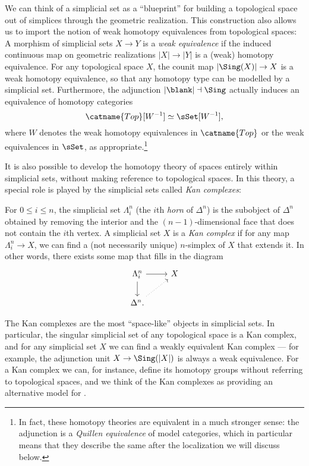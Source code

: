 \documentclass[a4paper,12pt]{article}
\renewcommand{\Top}{\catname{Top}}
\begin{document}
We can think of a simplicial set as a ``blueprint'' for building a
topological space out of simplices through the geometric
realization. This construction also allows us to import the notion of
weak homotopy equivalences from topological spaces: A morphism of
simplicial sets $X \to Y$ is a \emph{weak equivalence} if the induced
continuous map on geometric realizations $|X| \to |Y|$ is a (weak)
homotopy equivalence. For any topological space $X$, the counit map
$|\Sing(X)| \to X$ is a weak homotopy equivalence, so that any
homotopy type can be modelled by a simplicial set. Furthermore, the
adjunction $|\blank| \dashv \Sing$ actually induces an equivalence of homotopy
categories
\[ \Top[W^{-1}] \simeq \sSet[W^{-1}],\] where $W$ denotes the weak
homotopy equivalences in $\Top$ or the weak equivalences in $\sSet$,
as appropriate.\footnote{In fact, these homotopy theories are equivalent
  in a much stronger sense: the adjunction is a \emph{Quillen
    equivalence} of model categories, which in particular means that
  they describe the same \icat{} after the \icatl{} localization we
  will discuss below.}

It is also possible to develop the homotopy theory of spaces entirely
within simplicial sets, without making reference to topological
spaces. In this theory, a special role is played by the simplicial
sets called \emph{Kan complexes}:
\begin{defn}
  For $0 \leq i \leq n$, the simplicial set $\Lambda^{n}_{i}$ (the
  $i$th \emph{horn} of $\Delta^{n}$) is the subobject of $\Delta^{n}$
  obtained by removing the interior and the $(n-1)$-dimensional face
  that does not contain the $i$th vertex. A simplicial set $X$ is a
  \emph{Kan complex} if for any map $\Lambda^{n}_{i} \to X$, we can
  find a (not necessarily unique) $n$-simplex of $X$ that extends
  it. In other words, there exists some map that fills in the diagram
  \[
    \begin{tikzcd}
      \Lambda^{n}_{i} \arrow{r} \arrow{d} & X \\
      \Delta^{n}. \arrow[dotted]{ur}
    \end{tikzcd}
  \]
\end{defn}
The Kan complexes are the most ``space-like''
objects in simplicial sets. In particular, the singular simplicial set of any topological space is a Kan complex,
and for any simplicial set $X$ we can find a weakly equivalent Kan
complex --- for example, the adjunction unit $X \to \Sing(|X|)$ is
always a weak equivalence. For a Kan complex we can, for instance,
define its homotopy groups without referring to topological spaces,
and we think of the Kan complexes as providing an alternative model
for \igpds{}.
\end{document}
